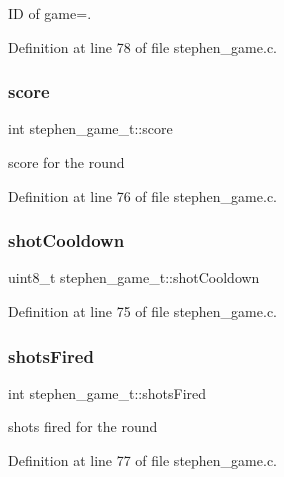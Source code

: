 ID of game=. 



Definition at line 78 of file stephen\+\_\+game.\+c.

\mbox{\label{structstephen__game__t_ae7004833cd3781e62d81db75b36f13dc}} 
\subsubsection{\texorpdfstring{score}{score}}
{\footnotesize\ttfamily int stephen\+\_\+game\+\_\+t\+::score}



score for the round 



Definition at line 76 of file stephen\+\_\+game.\+c.

\mbox{\label{structstephen__game__t_a9f603d972a88a53507662b789b369caf}} 
\subsubsection{\texorpdfstring{shotCooldown}{shotCooldown}}
{\footnotesize\ttfamily uint8\+\_\+t stephen\+\_\+game\+\_\+t\+::shot\+Cooldown}



Definition at line 75 of file stephen\+\_\+game.\+c.

\mbox{\label{structstephen__game__t_a65ff538b6969568e226978a2cb9f6996}} 
\subsubsection{\texorpdfstring{shotsFired}{shotsFired}}
{\footnotesize\ttfamily int stephen\+\_\+game\+\_\+t\+::shots\+Fired}



shots fired for the round 



Definition at line 77 of file stephen\+\_\+game.\+c.

